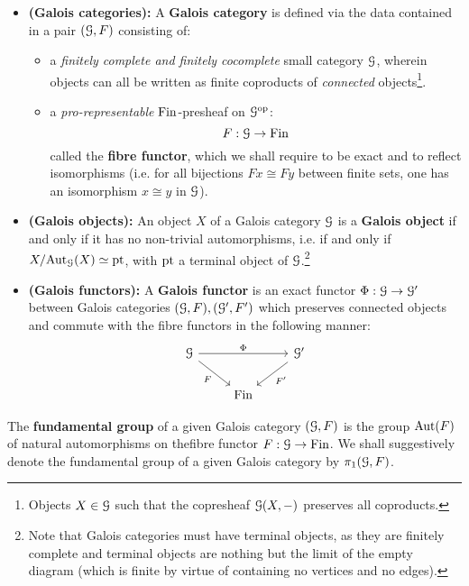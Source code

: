         \begin{definition} \label{def: galois_categories}
            \noindent
            \begin{itemize}
                \item \textbf{(Galois categories):} A \textbf{Galois category} is defined via the data contained in a pair $(\mathcal{G}, F)$ consisting of:
                \begin{itemize}
                    \item a \textit{finitely complete and finitely cocomplete} small category $\mathcal{G}$, wherein objects can all be written as finite coproducts of \textit{connected} objects\footnote{Objects $X \in \mathcal{G}$ such that the copresheaf $\mathcal{G}(X, -)$ preserves all coproducts.}.
                    \item a \textit{pro-representable} $\mathrm{Fin}$-presheaf on $\mathcal{G}^{\mathrm{op}}$:
                        $$F: \mathcal{G} \to \mathrm{Fin}$$
                    called the \textbf{fibre functor}, which we shall require to be exact and to reflect isomorphisms (i.e. for all bijections $Fx \cong Fy$ between finite sets, one has an isomorphism $x \cong y$ in $\mathcal{G}$).
                \end{itemize}
                \item \textbf{(Galois objects):} An object $X$ of a Galois category $\mathcal{G}$ is a \textbf{Galois object} if and only if it has no non-trivial automorphisms, i.e. if and only if $X/\mathrm{Aut}_{\mathcal{G}}(X) \simeq \mathrm{pt}$, with $\mathrm{pt}$ a terminal object of $\mathcal{G}$.\footnote{Note that Galois categories must have terminal objects, as they are finitely complete and terminal objects are nothing but the limit of the empty diagram (which is finite by virtue of containing no vertices and no edges).}
                \item \textbf{(Galois functors):} A \textbf{Galois functor} is an exact functor $\Phi: \mathcal{G} \to \mathcal{G}'$ between Galois categories $(\mathcal{G}, F), (\mathcal{G}', F')$ which preserves connected objects and commute with the fibre functors in the following manner:
                    $$
                        \begin{tikzcd}
                        	\calG && {\calG'} \\
                        	& \Fin
                        	\arrow["F"', from=1-1, to=2-2]
                        	\arrow["{F'}", from=1-3, to=2-2]
                        	\arrow["\Phi", from=1-1, to=1-3]
                        \end{tikzcd}
                    $$
            \end{itemize}
        \end{definition}
        \begin{definition} \label{def: fundamental_groups_of_galois_categories}
            The \textbf{fundamental group} of a given Galois category $(\mathcal{G}, F)$ is the group $\mathrm{Aut}(F)$ of natural automorphisms on thefibre functor $F: \mathcal{G} \to \mathrm{Fin}$. We shall suggestively denote the fundamental group of a given Galois category by $\pi_1(\mathcal{G}, F)$.
        \end{definition}
        
